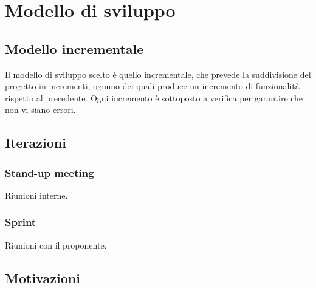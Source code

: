 \section{Modello di sviluppo}

\subsection{Modello incrementale}
Il modello di sviluppo scelto è quello incrementale, che prevede la suddivisione
del progetto in incrementi, ognuno dei quali produce un incremento di
funzionalità rispetto al precedente. Ogni incremento è sottoposto a verifica per
garantire che non vi siano errori.\\

\subsection{Iterazioni}

\subsubsection{Stand-up meeting}
Riunioni interne.

\subsubsection{Sprint}
Riunioni con il proponente.

\subsection{Motivazioni}
